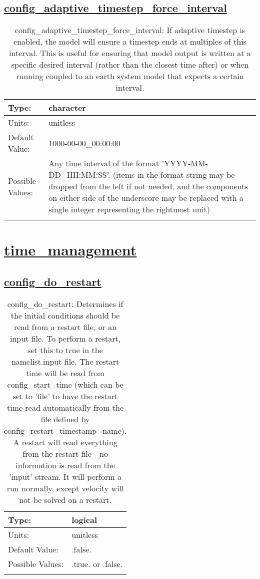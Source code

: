\subsection[config\_adaptive\_timestep\_force\_interval]{\hyperref[sec:nm_tab_time_integration]{config\_adaptive\_timestep\_force\_interval}}
\label{subsec:nm_sec_config_adaptive_timestep_force_interval}
\begin{center}
\begin{longtable}{| p{2.0in} || p{4.0in} |}
    \hline
    Type: & character \\
    \hline
    Units: & \si{unitless} \\
    \hline
    Default Value: & 1000-00-00\_00:00:00 \\
    \hline
    Possible Values: & Any time interval of the format 'YYYY-MM-DD\_HH:MM:SS'. (items in the format string may be dropped from the left if not needed, and the components on either side of the underscore may be replaced with a single integer representing the rightmost unit) \\
    \hline
    \caption{config\_adaptive\_timestep\_force\_interval: If adaptive timestep is enabled, the model will ensure a timestep ends at multiples of this interval.  This is useful for ensuring that model output is written at a specific desired interval (rather than the closest time after) or when running coupled to an earth system model that expects a certain interval.}
\end{longtable}
\end{center}
\section[time\_management]{\hyperref[sec:nm_tab_time_management]{time\_management}}
\label{sec:nm_sec_time_management}
\subsection[config\_do\_restart]{\hyperref[sec:nm_tab_time_management]{config\_do\_restart}}
\label{subsec:nm_sec_config_do_restart}
\begin{center}
\begin{longtable}{| p{2.0in} || p{4.0in} |}
    \hline
    Type: & logical \\
    \hline
    Units: & \si{unitless} \\
    \hline
    Default Value: & .false. \\
    \hline
    Possible Values: & .true. or .false. \\
    \hline
    \caption{config\_do\_restart: Determines if the initial conditions should be read from a restart file, or an input file.  To perform a restart, set this to true in the namelist.input file.  The restart time will be read from config\_start\_time (which can be set to 'file' to have the restart time read automatically from the file defined by config\_restart\_timestamp\_name). A restart will read everything from the restart file - no information is read from the 'input' stream.  It will perform a run normally, except velocity will not be solved on a restart.}
\end{longtable}
\end{center}
